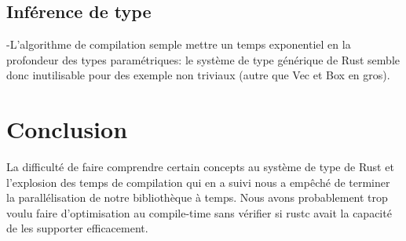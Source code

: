 \documentclass[a4paper]{article}
\renewcommand{\(}{\left(}
\renewcommand{\)}{\right)}
\begin{document}
\subsection{Inférence de type}
-L'algorithme de compilation semple mettre un temps exponentiel en la profondeur
des types paramétriques: le système de type générique de Rust semble donc inutilisable
pour des exemple non triviaux (autre que Vec et Box en gros).

\section{Conclusion}
La difficulté de faire comprendre certain concepts au système de type de Rust et
l'explosion des temps de compilation qui en a suivi nous a empêché de terminer la
parallélisation de notre bibliothèque à temps. Nous avons probablement trop
voulu faire d'optimisation au compile-time sans vérifier si rustc avait la
capacité de les supporter efficacement.
\end{document}
